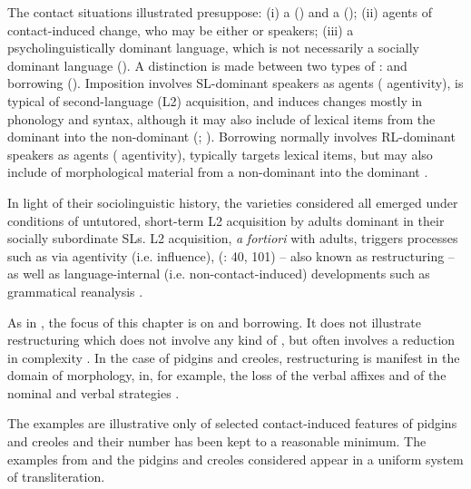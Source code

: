 \documentclass[output=paper]{langsci/langscibook}
\begin{document}
  The contact situations illustrated presuppose: (i) a  () and a  (); (ii) agents of contact-induced change, who may be either  or  speakers; (iii) a psycholinguistically dominant language, which is not necessarily a socially dominant language (\citealt{VanCoetsem1988,VanCoetsem1995,VanCoetsem2000,VanCoetsem2003,Winford2005,Winford2008}). A distinction is made between two types of :  and borrowing (\citealt{VanCoetsem1988,VanCoetsem2000,VanCoetsem2003}). Imposition involves SL-dominant speakers as agents ( agentivity), is typical of second-language (L2) acquisition, and induces changes mostly in phonology and syntax, although it may also include  of lexical items from the dominant  into the non-dominant  (\citealt[18]{VanCoetsem1995}; \citealt[376]{Winford2005}). Borrowing normally involves RL-dominant speakers as agents ( agentivity), typically targets lexical items, but may also include  of morphological material from a non-dominant  into the dominant .

  In light of their sociolinguistic history, the varieties considered all emerged under conditions of untutored, short-term L2 acquisition by adults dominant in their socially subordinate SLs. L2 acquisition, \textit{a} \textit{fortiori} with adults, triggers processes such as  via  agentivity (i.e.  influence),  (\citealt{Trudgill2011}: 40, 101) – also known as restructuring \citep[529]{Lucas2015} – as well as language-internal (i.e. non-contact-induced) developments such as grammatical reanalysis \citep[415]{Winford2005}.

  As in \citet{Manfredi2018}, the focus of this chapter is on  and borrowing. It does not illustrate restructuring which does not involve any kind of , but often involves a reduction in complexity \citep[529]{Lucas2015}. In the case of  pidgins and creoles, restructuring is manifest in the domain of morphology, in, for example, the loss of the  verbal affixes and of the nominal and verbal  strategies \citep{Miller1993}.

  The examples are illustrative only of selected contact-induced features of  pidgins and creoles and their number has been kept to a reasonable minimum. The examples from  and the pidgins and creoles considered appear in a uniform system of transliteration.
\end{document}
